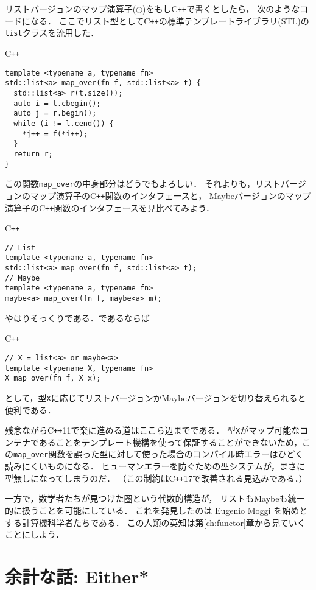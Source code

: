 \documentclass[a5paper,draft]{jsbook}
\newcommand{\programminglanguage}[1]{\textsf{#1}}
\newcommand{\cxx}{\programminglanguage{C}\texttt{++}}
\newcommand{\code}[1]{\texttt{#1}}
\newenvironment{cxxcode}{\begin{itembox}[r]{\cxx}}{\end{itembox}}
\newcommand{\mathMap}{\mathbin{\odot}}
\begin{document}
リストバージョンのマップ演算子($\mathMap$)をもし\cxx で書くとしたら，
次のようなコードになる．
ここでリスト型として\cxx の標準テンプレートライブラリ(STL)の
\code{list}クラスを流用した．
\begin{cxxcode}
\begin{verbatim}
template <typename a, typename fn>
std::list<a> map_over(fn f, std::list<a> t) {
  std::list<a> r(t.size());
  auto i = t.cbegin();
  auto j = r.begin();
  while (i != l.cend()) {
    *j++ = f(*i++);
  }
  return r;
}
\end{verbatim}
\end{cxxcode}
この関数\code{map\_over}の中身部分はどうでもよろしい．
それよりも，リストバージョンのマップ演算子の\cxx 関数のインタフェースと，
Maybeバージョンのマップ演算子の\cxx 関数のインタフェースを見比べてみよう．
\begin{cxxcode}
\begin{verbatim}
// List
template <typename a, typename fn>
std::list<a> map_over(fn f, std::list<a> t);
// Maybe
template <typename a, typename fn>
maybe<a> map_over(fn f, maybe<a> m);
\end{verbatim}
\end{cxxcode}
やはりそっくりである．であるならば
\begin{cxxcode}
\begin{verbatim}
// X = list<a> or maybe<a>
template <typename X, typename fn>
X map_over(fn f, X x);
\end{verbatim}
\end{cxxcode}
として，型\code{X}に応じてリストバージョンかMaybeバージョンを切り替えられると便利である．

残念ながら\cxx11で楽に進める道はここら辺までである．
型\code{X}がマップ可能なコンテナであることをテンプレート機構を使って保証することができないため，この\code{map\_over}関数を誤った型に対して使った場合のコンパイル時エラーはひどく読みにくいものになる．
ヒューマンエラーを防ぐための型システムが，まさに型無しになってしまうのだ．
（この制約は\cxx17で改善される見込みである．）

一方で，数学者たちが見つけた圏という代数的構造が，
リストもMaybeも統一的に扱うことを可能にしている．
これを発見したのは Eugenio Moggi を始めとする計算機科学者たちである．
この人類の英知は第\ref{ch:functor}章から見ていくことにしよう．


\section{余計な話: Either*}
\end{document}
